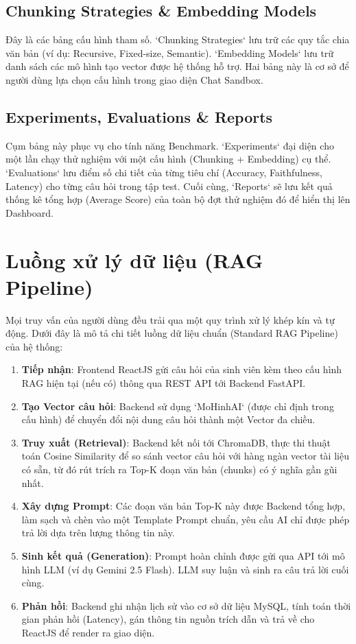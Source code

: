 \subsection*{Chunking Strategies \& Embedding Models}
Đây là các bảng cấu hình tham số. `Chunking Strategies` lưu trữ các quy tắc chia văn bản (ví dụ: Recursive, Fixed-size, Semantic). `Embedding Models` lưu trữ danh sách các mô hình tạo vector được hệ thống hỗ trợ. Hai bảng này là cơ sở để người dùng lựa chọn cấu hình trong giao diện Chat Sandbox.

\subsection*{Experiments, Evaluations \& Reports}
Cụm bảng này phục vụ cho tính năng Benchmark. `Experiments` đại diện cho một lần chạy thử nghiệm với một cấu hình (Chunking + Embedding) cụ thể. `Evaluations` lưu điểm số chi tiết của từng tiêu chí (Accuracy, Faithfulness, Latency) cho từng câu hỏi trong tập test. Cuối cùng, `Reports` sẽ lưu kết quả thống kê tổng hợp (Average Score) của toàn bộ đợt thử nghiệm đó để hiển thị lên Dashboard.

\section{Luồng xử lý dữ liệu (RAG Pipeline)}

Mọi truy vấn của người dùng đều trải qua một quy trình xử lý khép kín và tự động. Dưới đây là mô tả chi tiết luồng dữ liệu chuẩn (Standard RAG Pipeline) của hệ thống:

\begin{enumerate}
	\item \textbf{Tiếp nhận}: Frontend ReactJS gửi câu hỏi của sinh viên kèm theo cấu hình RAG hiện tại (nếu có) thông qua REST API tới Backend FastAPI.
	\item \textbf{Tạo Vector câu hỏi}: Backend sử dụng `MoHinhAI` (được chỉ định trong cấu hình) để chuyển đổi nội dung câu hỏi thành một Vector đa chiều.
	\item \textbf{Truy xuất (Retrieval)}: Backend kết nối tới ChromaDB, thực thi thuật toán Cosine Similarity để so sánh vector câu hỏi với hàng ngàn vector tài liệu có sẵn, từ đó rút trích ra Top-K đoạn văn bản (chunks) có ý nghĩa gần gũi nhất.
	\item \textbf{Xây dựng Prompt}: Các đoạn văn bản Top-K này được Backend tổng hợp, làm sạch và chèn vào một Template Prompt chuẩn, yêu cầu AI chỉ được phép trả lời dựa trên lượng thông tin này.
	\item \textbf{Sinh kết quả (Generation)}: Prompt hoàn chỉnh được gửi qua API tới mô hình LLM (ví dụ Gemini 2.5 Flash). LLM suy luận và sinh ra câu trả lời cuối cùng.
	\item \textbf{Phản hồi}: Backend ghi nhận lịch sử vào cơ sở dữ liệu MySQL, tính toán thời gian phản hồi (Latency), gán thông tin nguồn trích dẫn và trả về cho ReactJS để render ra giao diện.
\end{enumerate}

